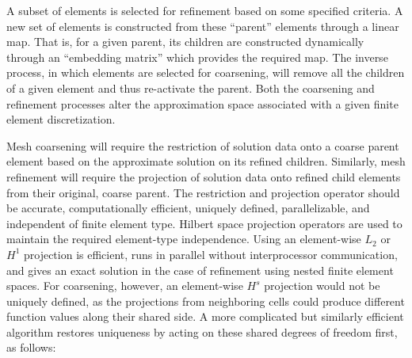 


A subset of elements is selected for refinement based on some specified criteria.  A new set of elements is constructed from these ``parent'' elements through a linear map.  That is, for a given parent, its children are constructed dynamically through an ``embedding matrix'' which provides the required map.  The inverse process, in which elements are selected for coarsening, will remove all the children of a given element and thus re-activate the parent.  Both the coarsening and refinement processes alter the approximation space associated with a given finite element discretization.

Mesh coarsening will require the restriction of solution data
onto a coarse parent element based on the approximate solution on its
refined children. Similarly, mesh refinement will require the
projection of solution data onto refined child elements from their
original, coarse parent.  The restriction and projection operator
should be accurate, computationally efficient, uniquely defined,
parallelizable, and independent of finite element type.  Hilbert space
projection operators are used to maintain the required element-type
independence.  Using an element-wise $L_2$ or $H^1$ projection is
efficient, runs in parallel without interprocessor communication, and
gives an exact solution in the case of refinement using nested finite
element spaces.  For coarsening, however, an element-wise $H^s$
projection would not be uniquely defined, as the projections from
neighboring cells could produce different function values along their
shared side.  A more complicated but similarly efficient algorithm
restores uniqueness by acting on these sha\-red degrees of freedom
first, as follows:

